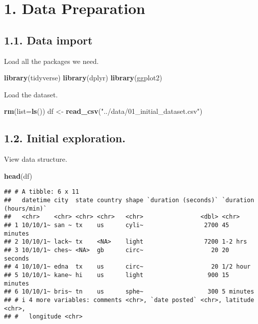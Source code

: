 \documentclass[
]{article}
\author{}
\date{\vspace{-2.5em}}
\newenvironment{Shaded}{\begin{snugshade}}{\end{snugshade}}
\newcommand{\AttributeTok}[1]{\textcolor[rgb]{0.13,0.29,0.53}{#1}}
\newcommand{\FunctionTok}[1]{\textcolor[rgb]{0.13,0.29,0.53}{\textbf{#1}}}
\newcommand{\NormalTok}[1]{#1}
\newcommand{\OtherTok}[1]{\textcolor[rgb]{0.56,0.35,0.01}{#1}}
\newcommand{\StringTok}[1]{\textcolor[rgb]{0.31,0.60,0.02}{#1}}
\begin{document}
\section{1. Data Preparation}\label{data-preparation}

\subsection{1.1. Data import}\label{data-import}

Load all the packages we need.

\begin{Shaded}
\begin{Highlighting}[]
\FunctionTok{library}\NormalTok{(tidyverse)}
\FunctionTok{library}\NormalTok{(dplyr)}
\FunctionTok{library}\NormalTok{(ggplot2)}
\end{Highlighting}
\end{Shaded}

Load the dataset.

\begin{Shaded}
\begin{Highlighting}[]
\FunctionTok{rm}\NormalTok{(}\AttributeTok{list=}\FunctionTok{ls}\NormalTok{())}
\NormalTok{df }\OtherTok{\textless{}{-}} \FunctionTok{read\_csv}\NormalTok{(}\StringTok{"../data/01\_initial\_dataset.csv"}\NormalTok{)}
\end{Highlighting}
\end{Shaded}

\subsection{1.2. Initial exploration.}\label{initial-exploration.}

View data structure.

\begin{Shaded}
\begin{Highlighting}[]
\FunctionTok{head}\NormalTok{(df)}
\end{Highlighting}
\end{Shaded}

\begin{verbatim}
## # A tibble: 6 x 11
##   datetime city  state country shape `duration (seconds)` `duration (hours/min)`
##   <chr>    <chr> <chr> <chr>   <chr>                <dbl> <chr>                 
## 1 10/10/1~ san ~ tx    us      cyli~                 2700 45 minutes            
## 2 10/10/1~ lack~ tx    <NA>    light                 7200 1-2 hrs               
## 3 10/10/1~ ches~ <NA>  gb      circ~                   20 20 seconds            
## 4 10/10/1~ edna  tx    us      circ~                   20 1/2 hour              
## 5 10/10/1~ kane~ hi    us      light                  900 15 minutes            
## 6 10/10/1~ bris~ tn    us      sphe~                  300 5 minutes             
## # i 4 more variables: comments <chr>, `date posted` <chr>, latitude <chr>,
## #   longitude <chr>
\end{verbatim}
\end{document}
